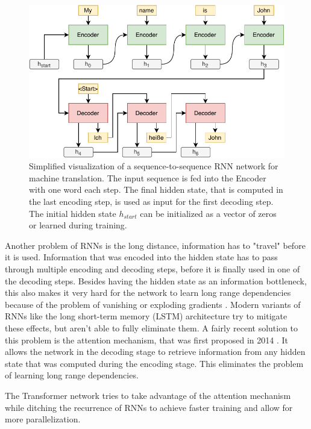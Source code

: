 \begin{figure}[h]
\centering
\includegraphics{figures/rnn-visualization}
\caption[Simplified visualization of a sequence-to-sequence RNN network for machine translation]{Simplified visualization of a sequence-to-sequence RNN network for machine translation. The input sequence is fed into the Encoder with one word each step. The final hidden state, that is computed in the last encoding step, is used as input for the first decoding step. The initial hidden state $h_{start}$ can be initialized as a vector of zeros or learned during training.}
\label{fig:rnn-visualization}
\end{figure}

Another problem of RNNs is the long distance, information has to "travel" before it is used. %
Information that was encoded into the hidden state has to pass through multiple encoding and decoding steps, before it is finally used in one of the decoding steps.
Besides having the hidden state as an information bottleneck, this also makes it very hard for the network to learn long range dependencies because of the problem of vanishing or exploding gradients \cite{Hochreiter01gradientflow}.
Modern variants of RNNs like the long short-term memory (LSTM) architecture \cite{Hochreiter1997} try to mitigate these effects, but aren't able to fully eliminate them.
A fairly recent solution to this problem is the attention mechanism, that was first proposed in 2014 \cite{1409.0473}.
It allows the network in the decoding stage to retrieve information from any hidden state that was computed during the encoding stage.
This eliminates the problem of learning long range dependencies.

The Transformer network tries to take advantage of the attention mechanism while ditching the recurrence of RNNs to achieve faster training and allow for more parallelization.

